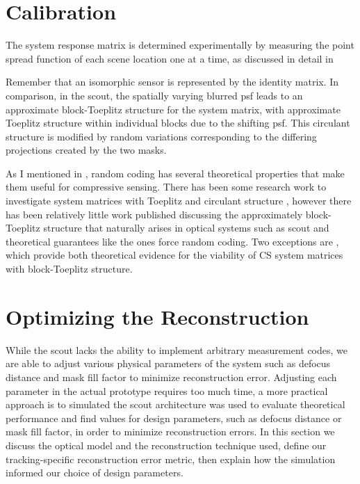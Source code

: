 \section{Calibration}\label{sec:ScoutCalibration}

The system response matrix is determined experimentally by measuring the point spread function of each scene location one at a time, as discussed in detail in 


Remember that an isomorphic sensor is represented by the identity matrix. In comparison,  in the \gls{scout}, the spatially varying blurred \gls{psf} leads to an approximate block-Toeplitz structure for the system matrix, with approximate Toeplitz structure within individual blocks due to the shifting \gls{psf}. This circulant structure is modified by random variations corresponding to the differing projections created by the two masks. 

As I mentioned in , random coding has several theoretical properties that make them useful for compressive sensing. There has been some research work to investigate system matrices with Toeplitz and circulant structure \cite{bajwa2007toeplitz, rauhut2009circulant, romberg2009compressive}, however there has been relatively little work published discussing the approximately block-Toeplitz structure that naturally arises in optical systems such as \gls{scout} and theoretical guarantees like the ones force random coding. Two exceptions are \cite{sebert2008toeplitz, liu2008sparsesense}, which provide both theoretical evidence for the viability of CS system matrices with block-Toeplitz structure.


\section{Optimizing the Reconstruction}\label{sec:ScoutSimulations}

While the \gls{scout} lacks the ability to implement arbitrary measurement codes, we are able to adjust various physical parameters of the system such as defocus distance and mask fill factor to minimize reconstruction error. Adjusting each parameter in the actual prototype requires too much time, a more practical approach is to simulated the \gls{scout} architecture was used to evaluate theoretical performance and find values for design parameters, such as defocus distance or mask fill factor, in order to minimize reconstruction errors. In this section we discuss the optical model and the reconstruction technique used, define our tracking-specific reconstruction error metric, then explain how the simulation informed our choice of design parameters.

